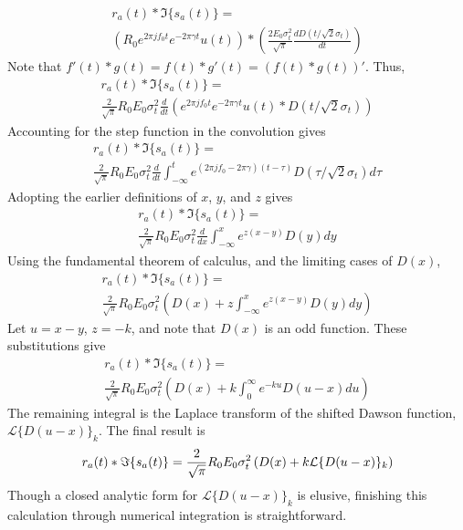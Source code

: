\documentclass[amsmath,amssymb,aps,prd,10pt,twocolumn,showkeys]{revtex4}
\begin{document}
\begin{itemize}
\begin{multline}
r_a(t) * \Im\lbrace s_a(t) \rbrace = \\ \left(R_0 e^{2\pi j f_0 t} e^{-2\pi \gamma t} u(t)\right) * \left(\frac{2 E_0 \sigma_t^2}{\sqrt{\pi}}\frac{dD(t/\sqrt{2}\sigma_t)}{dt} \right)
\end{multline}
Note that $f'(t) * g(t) = f(t) * g'(t) = (f(t) * g(t))'$.  Thus,
\begin{multline}
r_a(t) * \Im\lbrace s_a(t) \rbrace = \\ \frac{2}{\sqrt{\pi}} R_0 E_0 \sigma_t^2 \frac{d}{dt}\left(e^{2\pi j f_0 t}e^{-2\pi\gamma t} u(t) * D(t/\sqrt{2}\sigma_t) \right)
\end{multline}
Accounting for the step function in the convolution gives
\begin{multline}
r_a(t) * \Im\lbrace s_a(t) \rbrace = \\ \frac{2}{\sqrt{\pi}} R_0 E_0 \sigma_t^2 \frac{d}{dt} \int_{-\infty}^{t} e^{(2\pi j f_0 - 2\pi\gamma)(t-\tau)}D(\tau/\sqrt{2}\sigma_t)d\tau
\end{multline}
Adopting the earlier definitions of $x$, $y$, and $z$ gives
\begin{multline}
r_a(t) * \Im\lbrace s_a(t) \rbrace = \\ \frac{2}{\sqrt{\pi}} R_0 E_0 \sigma_t^2 \frac{d}{dx} \int_{-\infty}^{x} e^{z(x-y)} D(y) dy
\end{multline}
Using the fundamental theorem of calculus, and the limiting cases of $D(x)$, 
\begin{multline}
r_a(t) * \Im\lbrace s_a(t) \rbrace = \\ \frac{2}{\sqrt{\pi}} R_0 E_0 \sigma_t^2 \left(D(x) + z\int_{-\infty}^{x} e^{z(x-y)} D(y) dy \right)
\end{multline}
Let $u = x-y$, $z=-k$, and note that $D(x)$ is an odd function.  These substitutions give
\begin{multline}
r_a(t) * \Im\lbrace s_a(t) \rbrace = \\ \frac{2}{\sqrt{\pi}} R_0 E_0 \sigma_t^2 \left(D(x) + k\int_{0}^{\infty} e^{-ku} D(u-x) du \right)
\end{multline}
The remaining integral is the Laplace transform of the shifted Dawson function, $\mathcal{L}\lbrace D(u-x)\rbrace_k$.  The final result is
\begin{equation}
r_a(t) * \Im\lbrace s_a(t) \rbrace = \\ \frac{2}{\sqrt{\pi}} R_0 E_0 \sigma_t^2 \left(D(x) + k\mathcal{L}\lbrace D(u-x)\rbrace_k\right) \label{eq:Im_result}
\end{equation}
Though a closed analytic form for $\mathcal{L}\lbrace D(u-x)\rbrace_k$ is elusive, finishing this calculation through numerical integration is straightforward.

\end{itemize}
\end{document}
